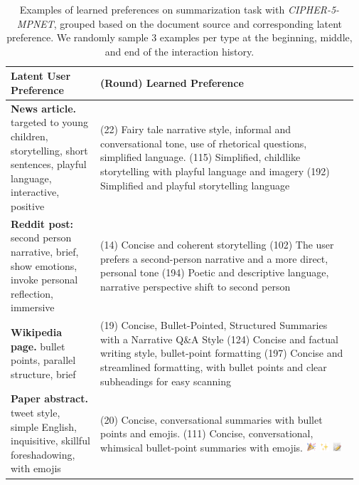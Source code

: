 \begin{table}[t!]
    \centering \small
    \setlength{\tabcolsep}{3pt}
    \caption{Examples of learned preferences on summarization task with \textit{CIPHER-5-MPNET}, grouped based on the document source and corresponding latent preference. We randomly sample 3 examples per type at the beginning, middle, and end of the interaction history.}   
    \begin{tabular}{p{0.25\linewidth} p{0.72\linewidth}} %
        \toprule
        \textbf{Latent User Preference} & \textbf{(Round) Learned Preference} \\
        \midrule
         \textbf{News article.} targeted to young children, storytelling, short sentences, playful language, interactive, positive & (22) Fairy tale narrative style, informal and conversational tone, use of rhetorical questions, simplified language.
         \newline (115) Simplified, childlike storytelling with playful language and imagery
         \newline (192) Simplified and playful storytelling language  \\
        \midrule
        \textbf{Reddit post:} second person narrative, brief, show emotions, invoke personal reflection, immersive   &  (14) Concise and coherent storytelling 
         \newline (102) The user prefers a second-person narrative and a more direct, personal tone 
         \newline (194) Poetic and descriptive language, narrative perspective shift to second person\\
         \midrule
         \textbf{Wikipedia page.} bullet points, parallel structure, brief & (19) Concise, Bullet-Pointed, Structured Summaries with a Narrative Q\&A Style
         \newline (124) Concise and factual writing style, bullet-point formatting 
            \newline (197) Concise and streamlined formatting, with bullet points and clear subheadings for easy scanning \\
         \midrule
         \textbf{Paper abstract.} tweet style, simple English, inquisitive, skillful foreshadowing, with emojis & (20) Concise, conversational summaries with bullet points and emojis. 
         \newline 
         (111) Concise, conversational, whimsical bullet-point summaries with emojis. \includegraphics[height=10pt]{graphs/tada.png} \includegraphics[height=10pt]{graphs/sparkles.png} \includegraphics[height=10pt]{graphs/write.png}

\end{tabular}
\end{table}
